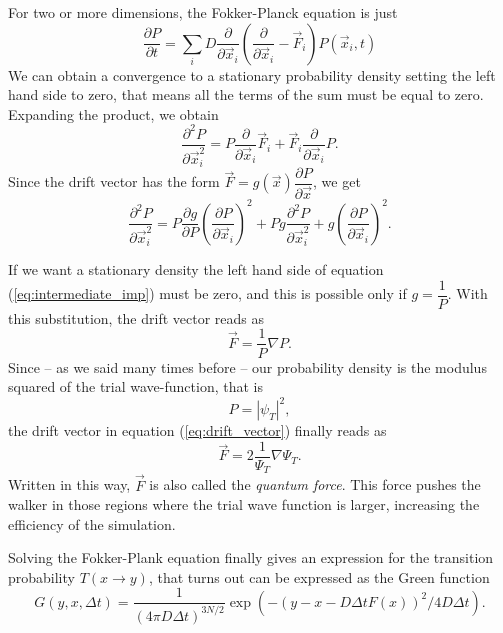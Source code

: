 \documentclass[a4paper,twoside,11pt]{book}
\begin{document}
For two or more dimensions, the Fokker-Planck equation is just
\begin{equation}
	\frac{\partial P}{\partial t} = \sum_i D \dfrac{\partial}{\partial \vec{x}_i} \left( \frac{\partial}{\partial \vec{x}_i} - \vec{F}_i \right)P(\vec{x}_i,t)
\end{equation}
We can obtain a convergence to a stationary probability density setting the left hand side to zero, that means all the terms of the sum must be equal to zero. Expanding the product, we obtain
\begin{equation}
	\frac{\partial^2 P}{\partial \vec{x}_i^2} = P \frac{\partial}{\partial \vec{x}_i}\vec{F}_i + \vec{F}_i \frac{\partial}{\partial \vec{x}_i}P.
\end{equation}
Since the drift vector has the form $\vec{F} = g(\vec{x}) \dfrac{\partial P}{\partial \vec{x}}$, we get
\begin{equation}
	\frac{\partial ^2 P}{\partial \vec{x}_i^2 } = P \frac{\partial g}{\partial P} \left( \frac{\partial P}{\partial \vec{x}_i} \right)^2 + Pg \frac{\partial ^2 P}{\partial \vec{x}_i^2} + g \left( \frac{\partial P}{\partial \vec{x}_i} \right)^2.
	\label{eq:intermediate_imp}
\end{equation}

If we want a stationary density the left hand side of equation (\ref{eq:intermediate_imp}) must be zero, and this is possible only if $g = \dfrac{1}{P}$. With this substitution, the drift vector reads as
\begin{equation}
	\vec{F} = \frac{1}{P} \nabla P.
	\label{eq:drift_vector}
\end{equation}
Since -- as we said many times before --  our probability density is the modulus squared of the trial wave-function, that is
\begin{equation}
	P = |\psi_T|^2,
\end{equation}
the drift vector in equation (\ref{eq:drift_vector}) finally reads as
\begin{equation}
	\vec{F} = 2 \frac{1}{\Psi_T} \nabla \Psi_T.
\end{equation}
Written in this way, $\vec{F}$ is also called the \emph{quantum force}. This force pushes the walker in those regions where the trial wave function is larger, increasing the efficiency of the simulation.

Solving the Fokker-Plank equation finally gives an expression for the transition probability $T(x \rightarrow y)$, that turns out can be expressed as the Green function
\begin{equation}
G(y,x, \Delta t) = \dfrac{1}{(4 \pi D \Delta t)^{3N/2}} \exp(-(y - x - D \Delta t F(x))^2 / 4 D \Delta t).
\end{equation}
\end{document}
